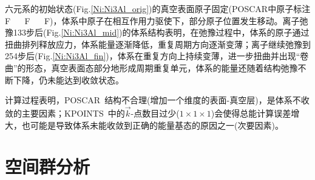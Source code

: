 \documentclass[10pt,a4paper]{article}
\begin{document}
六元系的初始状态(Fig.\ref{Ni:Ni3Al_orig})的真空表面原子固定(\textrm{POSCAR}中原子标注\textrm{F ~~ F ~~ F})，体系中原子在相互作用力驱使下，部分原子位置发生移动。离子弛豫133步后(Fig.\ref{Ni:Ni3Al_mid})的体系结构表明，在弛豫过程中，体系的原子通过扭曲排列释放应力，体系能量逐渐降低，重复周期方向逐渐变薄；离子继续弛豫到254步后(Fig.\ref{Ni:Ni3Al_fin})，体系在重复方向上持续变薄，进一步扭曲并出现“卷曲”的形态，真空表面态部分地形成周期重复单元，体系的能量还随着结构弛豫不断下降，仍未能达到收敛状态。

计算过程表明，\textrm{POSCAR~}结构不合理(增加一个维度的表面-真空层)，是体系不收敛的主要因素；\textrm{KPOINTS~}中的$\vec k$-点数目过少($1\times1\times1$)会使得总能计算误差增大，也可能是导致体系未能收敛到正确的能量基态的原因之一(次要因素)。

\section{空间群分析}


\end{document}
